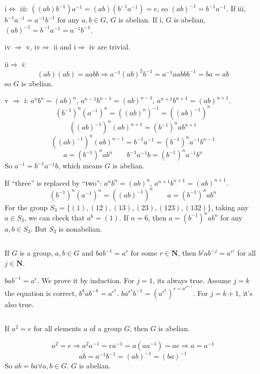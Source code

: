 \begin{answer}
    i$\Leftrightarrow$ iii: $((ab)b^{-1})a^{-1}=(ab)(b^{-1}a^{-1})=e$, so $(ab)^{-1}=b^{-1}a^{-1}$. If iii, $b^{-1}a^{-1}=a^{-1}b^{-1}$ for any $a,b \in G$, $G$ is abelian. If i, $G$ is abelian, $(ab)^{-1}=b^{-1}a^{-1}=a^{-1}b^{-1}$.

    iv $\Rightarrow$ v, iv$\Rightarrow$ ii and i$\Rightarrow$ iv are trivial.

    ii$\Rightarrow$ i: \[(ab)(ab)=aabb\Rightarrow a^{-1}(ab)^{2}b^{-1}=a^{-1}aabbb^{-1}=ba=ab\] so $G$ is abelian.

    v $\Rightarrow$ i: $a^{n}b^{n}=(ab)^{n}$, $a^{n-1}b^{n-1}=(ab)^{n-1}$, $a^{n+1}b^{n+1}=(ab)^{n+1}$. \[(b^{-1})^{n}(a^{-1})^{n}=((ab)^{n})^{-1}=((ab)^{-1})^{n}\]\[((ab)^{-1})^{n}(ab)^{n+1}=(b^{-1})^{n}ab^{n+1}\]\[((ab)^{-1})^{n}(ab)^{n-1}=b^{-1}a^{-1}=(b^{-1})^{n}a^{-1}b^{n-1}\]\[a=(b^{-1})^{n}ab^{n}\qquad b^{-1}a^{-1}b=(b^{-1})^{n}a^{-1}b^{n}\]So $a^{-1}=b^{-1}a^{-1}b$, which means $G $ is abelian.

    If ``three'' is replaced by ``two'': $a^{n}b^{n}=(ab)^{n}$, $a^{n+1}b^{n+1}=(ab)^{n+1}$. \[(b^{-1})^{n}(a^{-1})^{n}=((ab)^{-1})^{n}\qquad a=(b^{-1})^{n}ab^{n}\] 
    For the group $S_3=\{(1),(12),(13),(23),(123),(132)\}$, taking any $a\in S_3$, we can check that $a^{6}=(1)$. If $n=6$, then $a=(b^{-1})^{n}ab^{n}$ for any $a,b \in S_3$. But $S_3$ is nonabelian.
\end{answer}

$$ $$

\begin{ex}
    If $G$ is a group, $a,b\in G$ and $bab^{-1}=a^{r}$ for some $r\in \mathbf{N}$, then $b^{j}ab^{-j}=a^{r^{j}}$ for all $j\in \mathbf{N}$. 
\end{ex}

\begin{answer}
    $bab^{-1}= a^{r}$. We prove it by induction. For $j=1$, its always true. Assume $j=k$ the equation is correct, $b^{k}ab^{-k}=a^{r^{k}}$. $ba^{r^{k}}b^{-1}=(a^{r^{k}})^{r=a^{r^{k+1}}}$. For $j=k+1$, it's also true.
\end{answer}

$$ $$

\begin{ex}
    If $a^{2}=e$ for all elements $a$ of a group $G$, then $G$ is abelian.
\end{ex}

\begin{answer}
    \[a^{2}=e\Rightarrow a^{2}a^{-1}=ea^{-1}=a(aa^{-1})=ae\Rightarrow a=a^{-1}\]\[ab=a^{-1}b^{-1}=(ab)^{-1}=(ba)^{-1}\]So  $ab=ba \forall a,b \in G$. $G$ is abelian.
\end{answer}

